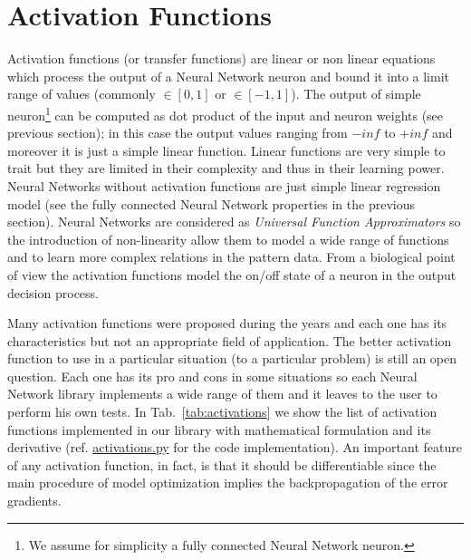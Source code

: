 \documentclass{standalone}
\begin{document}

\section[Activation functions]{Activation Functions}\label{activation}

Activation functions (or transfer functions) are linear or non linear equations which process the output of a Neural Network neuron and bound it into a limit range of values (commonly $\in[0, 1]$ or $\in[-1, 1]$).
The output of simple neuron\footnote{
  We assume for simplicity a fully connected Neural Network neuron.
} can be computed as dot product of the input and neuron weights (see previous section); in this case the output values ranging from $-inf$ to $+inf$ and moreover it is just a simple linear function.
Linear functions are very simple to trait but they are limited in their complexity and thus in their learning power.
Neural Networks without activation functions are just simple linear regression model (see the fully connected Neural Network properties in the previous section).
Neural Networks are considered as \emph{Universal Function Approximators} so the introduction of non-linearity allow them to model a wide range of functions and to learn more complex relations in the pattern data.
From a biological point of view the activation functions model the on/off state of a neuron in the output decision process.

Many activation functions were proposed during the years and each one has its characteristics but not an appropriate field of application.
The better activation function to use in a particular situation (to a particular problem) is still an open question.
Each one has its pro and cons in some situations so each Neural Network library implements a wide range of them and it leaves to the user to perform his own tests.
In Tab.~\ref{tab:activations} we show the list of activation functions implemented in our library with mathematical formulation and its derivative (ref. \href{https://github.com/Nico-Curti/NumPyNet/blob/master/NumPyNet/activations.py}{\textsf{activations.py}} for the code implementation).
An important feature of any activation function, in fact, is that it should be differentiable since the main procedure of model optimization implies the backpropagation of the error gradients.
\end{document}

